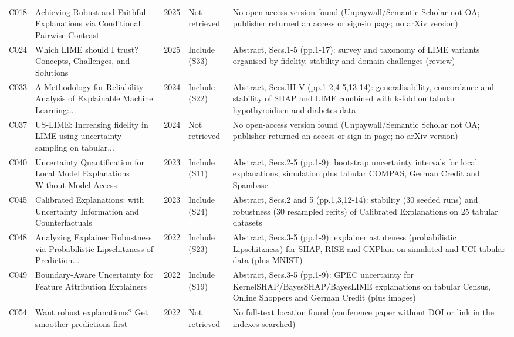 \begin{longtable}{@{}P{1.0cm}P{6.3cm}P{0.7cm}P{1.6cm}P{6.1cm}@{}}
C018 & Achieving Robust and Faithful Explanations via Conditional Pairwise Contrast & 2025 & Not retrieved & No open-access version found (Unpaywall/\allowbreak{}Semantic Scholar not OA; publisher returned an access or sign-in page; no arXiv version) \\
C024 & Which LIME should I trust? Concepts, Challenges, and Solutions & 2025 & Include (S33) & Abstract, Secs.1-5 (pp.1-17): survey and taxonomy of LIME variants organised by fidelity, stability and domain challenges (review) \\
C033 & A Methodology for Reliability Analysis of Explainable Machine Learning:... & 2024 & Include (S22) & Abstract, Secs.III-V (pp.1-2,4-5,13-14): generalisability, concordance and stability of SHAP and LIME combined with k-fold on tabular hypothyroidism and diabetes data \\
C037 & US-LIME: Increasing fidelity in LIME using uncertainty sampling on tabular... & 2024 & Not retrieved & No open-access version found (Unpaywall/\allowbreak{}Semantic Scholar not OA; publisher returned an access or sign-in page; no arXiv version) \\
C040 & Uncertainty Quantification for Local Model Explanations Without Model Access & 2023 & Include (S11) & Abstract, Secs.2-5 (pp.1-9): bootstrap uncertainty intervals for local explanations; simulation plus tabular COMPAS, German Credit and Spambase \\
C045 & Calibrated Explanations: with Uncertainty Information and Counterfactuals & 2023 & Include (S24) & Abstract, Secs.2 and 5 (pp.1,3,12-14): stability (30 seeded runs) and robustness (30 resampled refits) of Calibrated Explanations on 25 tabular datasets \\
C048 & Analyzing Explainer Robustness via Probabilistic Lipschitzness of Prediction... & 2022 & Include (S23) & Abstract, Secs.3-5 (pp.1-9): explainer astuteness (probabilistic Lipschitzness) for SHAP, RISE and CXPlain on simulated and UCI tabular data (plus MNIST) \\
C049 & Boundary-Aware Uncertainty for Feature Attribution Explainers & 2022 & Include (S19) & Abstract, Secs.3-5 (pp.1-9): GPEC uncertainty for KernelSHAP/\allowbreak{}BayesSHAP/\allowbreak{}BayesLIME explanations on tabular Census, Online Shoppers and German Credit (plus images) \\
C054 & Want robust explanations? Get smoother predictions first & 2022 & Not retrieved & No full-text location found (conference paper without DOI or link in the indexes searched) \\

\end{longtable}
